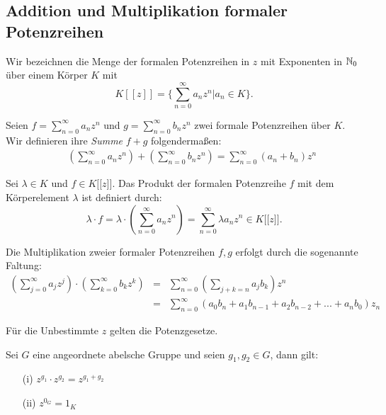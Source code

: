 \subsection{Addition und Multiplikation formaler Potenzreihen} \label{Rechnen}
Wir bezeichnen die Menge der formalen Potenzreihen in $z$ mit Exponenten in $\mathbb{N}_0$ über einem Körper $K$ mit \[K [[z]] = \lbrace \sum_{n=0}^\infty a_n z^n \vert a_n\in K \rbrace. \]
%
%
%
%
\begin{defn}\label{AdditionPotenzreihen}
%
Seien $f = \sum_{n=0}^\infty a_n z^n$ und $g = \sum_{n=0}^\infty b_n z^n$ zwei formale Potenzreihen über $K$. Wir definieren ihre \textit{Summe} $f+g$ folgendermaßen:
\begin{eqnarray*}
&&\left( \sum_{n=0}^\infty a_n z^n \right) + \left( \sum_{n=0}^\infty b_n z^n \right) = \sum_{n=0}^{\infty} (a_n + b_n) z^n 
\end{eqnarray*}
\end{defn}
%
%
% 
\begin{defn}\label{MultiplikationKPotenzreihen}
Sei $\lambda \in K$ und $f \in K\lbrack\lbrack z \rbrack\rbrack$. Das Produkt der formalen Potenzreihe $f$ mit dem Körperelement $\lambda$ ist definiert durch:
\[\lambda\cdot f = \lambda\cdot \left(\sum_{n=0}^{\infty}a_nz^n\right) = \sum_{n=0}^{\infty} \lambda a_nz^n \in K\lbrack\lbrack z\rbrack\rbrack. 
\]
\end{defn}
%
%
\begin{defn}\label{MultiplikationPotenzreihen}
Die Multiplikation zweier formaler Potenzreihen $f,g$ erfolgt durch die sogenannte Faltung:
\begin{eqnarray*}
\left( \sum_{j=0}^\infty a_j z^j \right)\cdot \left( \sum_{k=0}^\infty b_k z^k \right) &=&\sum_{n=0}^\infty \left(\sum_{j+k=n} a_j b_k\right) z^n \\
&=& \sum_{n= 0}^\infty \left(a_0b_n + a_1b_{n-1} + a_2b_{n-2} + ... + a_nb_0 \right)z_n
\end{eqnarray*}
\end{defn}
%
Für die Unbestimmte $z$ gelten die Potenzgesetze.
\begin{bem}\label{Potenzgesetze}
Sei $G$ eine angeordnete abelsche Gruppe und seien $g_1, g_2 \in G$, dann gilt:
\begin{itemize}
\item[(i)] $z^{g_1} \cdot z^{g_2} = z^{g_1 + g_2}$
\item[(ii)] $z^{0_G} = 1_K$
\end{itemize}
\end{bem}

